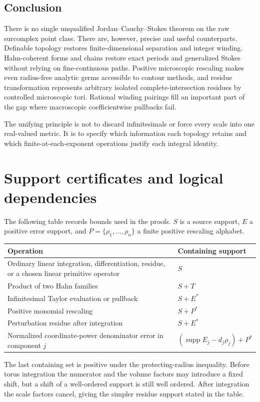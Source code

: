 \documentclass[11pt,letterpaper]{article}
\theoremstyle{definition}
\theoremstyle{remark}
\newcommand{\supp}{\operatorname{supp}}\newcommand{\Res}{\operatorname{Res}}
\numberwithin{equation}{section}
\begin{document}
\subsection{Conclusion}
There is no single unqualified Jordan--Cauchy--Stokes theorem on the raw surcomplex point class. There are, however, precise and useful counterparts. Definable topology restores finite-dimensional separation and integer winding. Hahn-coherent forms and chains restore exact periods and generalized Stokes without relying on fine-continuous paths. Positive microscopic rescaling makes even radius-free analytic germs accessible to contour methods, and residue transformation represents arbitrary isolated complete-intersection residues by controlled microscopic tori. Rational winding pairings fill an important part of the gap where macroscopic coefficientwise pullbacks fail.

The unifying principle is not to discard infinitesimals or force every scale into one real-valued metric. It is to specify which information each topology retains and which finite-at-each-exponent operations justify each integral identity.

\appendix
\section{Support certificates and logical dependencies}\label{app:support}

The following table records bounds used in the proofs. $S$ is a source support, $E$ a positive error support, and $P=\{\rho_1,\ldots,\rho_n\}$ a finite positive rescaling alphabet.
\begin{center}\small
\begin{tabular}{@{}L{0.57\textwidth}L{0.34\textwidth}@{}}
\toprule
Operation & Containing support\\
\midrule
Ordinary linear integration, differentiation, residue, or a chosen linear primitive operator & $S$\\[0.4em]
Product of two Hahn families & $S+T$\\[0.4em]
Infinitesimal Taylor evaluation or pullback & $S+E^*$\\[0.4em]
Positive monomial rescaling & $S+P^*$\\[0.4em]
Perturbation residue after integration & $S+E^*$\\[0.4em]
Normalized coordinate-power denominator error in component $j$ & $(\supp E_j-d_j\rho_j)+P^*$\\
\bottomrule
\end{tabular}
\end{center}
The last containing set is positive under the protecting-radius inequality. Before torus integration the numerator and the volume factors may introduce a fixed shift, but a shift of a well-ordered support is still well ordered. After integration the scale factors cancel, giving the simpler residue support stated in the table.
\end{document}
